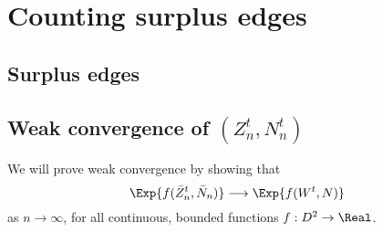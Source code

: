 
\chapter{Counting surplus edges}

\section{Surplus edges}

\section{Weak convergence of $(Z^t_n, N^t_n)$}


We will prove weak convergence by showing that
\begin{equation}
\Exp{ f(\bar{Z}^t_n, \bar{N}_n) } \longrightarrow \Exp{ f(W^t, N) }
\end{equation}
as $n \rightarrow \infty$, 
for all continuous, bounded functions 
$f: D^2 \rightarrow \Real$.
